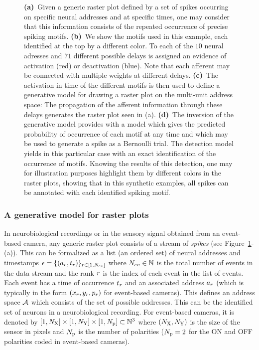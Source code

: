 \documentclass[default]{sn-jnl}%
\theoremstyle{thmstyleone}%
\theoremstyle{thmstyletwo}%
\theoremstyle{thmstylethree}%
\begin{document}
\begin{figure}
{	    {\bf (a)}~Given a generic raster plot defined by a set of spikes occurring on specific neural addresses and at specific times, one may consider that this information consists of the repeated occurrence of precise spiking motifs. 
	    {\bf (b)}~We show the motifs used in this example, each identified at the top by a different color. To each of the $10$ neural adresses and $71$ different possible delays is assigned an evidence of activation (red) or deactivation (blue). Note that each afferent may be connected with multiple weights at different delays.
	    {\bf (c)}~The activation in time of the different motifs is then used to define a generative model for drawing a raster plot on the multi-unit address space: The propagation of the afferent information through these delays generates the raster plot seen in (a). 
	    {\bf (d)}~The inversion of the generative model provides with a model which gives the predicted probability of occurrence of each motif at any time and which may be used to generate a spike as a Bernoulli trial. The detection model yields in this particular case with an exact identification of the occurrence of motifs. Knowing the results of this detection, one may for illustration purposes highlight them by different colors in the raster plots, showing that in this synthetic examples, all spikes can be annotated with each identified spiking motif. 
	    }
    \label{fig:model}
\end{figure}
% 
\subsubsection{A generative model for raster plots}
%
In neurobiological recordings or in the sensory signal obtained from an event-based camera, any generic raster plot consists of a stream of \emph{spikes} (see Figure~\ref{fig:model}-(a)). This can be formalized as a list (an ordered set) of neural addresses and timestamps  $\epsilon = \{(a_r, t_r)\}_{r \in [1,N_{ev}]}$ where $N_{ev} \in \mathbb{N} $ is the total number of events in the data stream and the rank $r$ is the index of each event in the list of events. Each event has a time of occurrence $t_r$  and an associated address $a_r$ (which is typically in the form $(x_r, y_r, p_r)$ for event-based cameras). This defines an address space $\mathcal{A}$ which consists of the set of possible addresses. This can be the identified set of neurons in a neurobiological recording. For event-based cameras, it is denoted by $[1, N_\text{X}]\times[1, N_\text{Y}] \times [1, N_\text{p}] \subset \mathbb{N}^3$ where $(N_\text{X}, N_\text{Y})$ is the size of the sensor in pixels and $N_\text{p}$ is the number of polarities ($N_\text{p}=2$ for the ON and OFF polarities coded in event-based cameras). 
\end{document}
